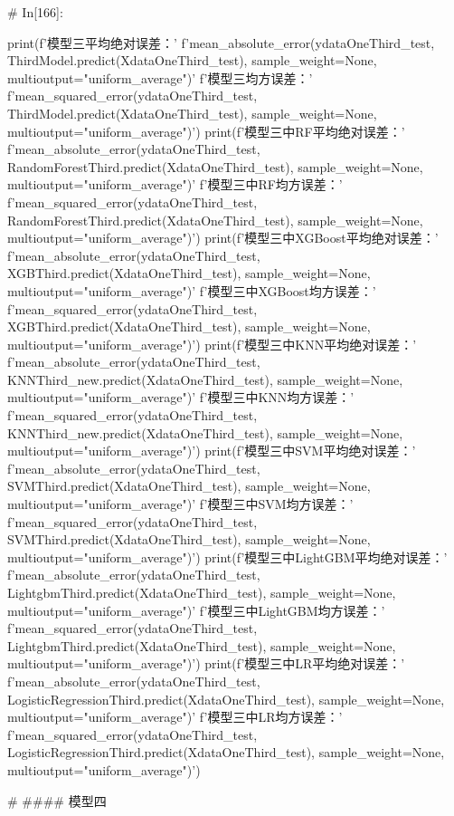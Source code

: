 \documentclass{MathorCupmodeling}
\begin{document}
\begin{python}
	# In[166]:
	
	
	print(f'模型三平均绝对误差：'
		  f'{mean_absolute_error(ydataOneThird_test, ThirdModel.predict(XdataOneThird_test), sample_weight=None, multioutput="uniform_average")}\n'
		  f'模型三均方误差：'
		  f'{mean_squared_error(ydataOneThird_test, ThirdModel.predict(XdataOneThird_test), sample_weight=None, multioutput="uniform_average")}')
	print(f'模型三中RF平均绝对误差：'
		  f'{mean_absolute_error(ydataOneThird_test, RandomForestThird.predict(XdataOneThird_test), sample_weight=None, multioutput="uniform_average")}\n'
		  f'模型三中RF均方误差：'
		  f'{mean_squared_error(ydataOneThird_test, RandomForestThird.predict(XdataOneThird_test), sample_weight=None, multioutput="uniform_average")}')
	print(f'模型三中XGBoost平均绝对误差：'
		  f'{mean_absolute_error(ydataOneThird_test, XGBThird.predict(XdataOneThird_test), sample_weight=None, multioutput="uniform_average")}\n'
		  f'模型三中XGBoost均方误差：'
		  f'{mean_squared_error(ydataOneThird_test, XGBThird.predict(XdataOneThird_test), sample_weight=None, multioutput="uniform_average")}')
	print(f'模型三中KNN平均绝对误差：'
		  f'{mean_absolute_error(ydataOneThird_test, KNNThird_new.predict(XdataOneThird_test), sample_weight=None, multioutput="uniform_average")}\n'
		  f'模型三中KNN均方误差：'
		  f'{mean_squared_error(ydataOneThird_test, KNNThird_new.predict(XdataOneThird_test), sample_weight=None, multioutput="uniform_average")}')
	print(f'模型三中SVM平均绝对误差：'
		  f'{mean_absolute_error(ydataOneThird_test, SVMThird.predict(XdataOneThird_test), sample_weight=None, multioutput="uniform_average")}\n'
		  f'模型三中SVM均方误差：'
		  f'{mean_squared_error(ydataOneThird_test, SVMThird.predict(XdataOneThird_test), sample_weight=None, multioutput="uniform_average")}')
	print(f'模型三中LightGBM平均绝对误差：'
		  f'{mean_absolute_error(ydataOneThird_test, LightgbmThird.predict(XdataOneThird_test), sample_weight=None, multioutput="uniform_average")}\n'
		  f'模型三中LightGBM均方误差：'
		  f'{mean_squared_error(ydataOneThird_test, LightgbmThird.predict(XdataOneThird_test), sample_weight=None, multioutput="uniform_average")}')
	print(f'模型三中LR平均绝对误差：'
		  f'{mean_absolute_error(ydataOneThird_test, LogisticRegressionThird.predict(XdataOneThird_test), sample_weight=None, multioutput="uniform_average")}\n'
		  f'模型三中LR均方误差：'
		  f'{mean_squared_error(ydataOneThird_test, LogisticRegressionThird.predict(XdataOneThird_test), sample_weight=None, multioutput="uniform_average")}')
	
	# #### 模型四
	

\end{python}
\end{document}
